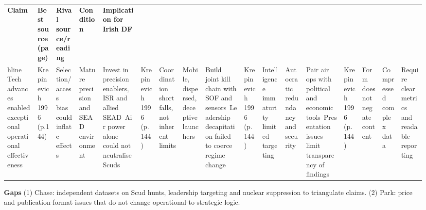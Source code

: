 \usepackage{array}
\begin{tabular}{p{3.2cm}p{4.2cm}p{3.6cm}p{3.2cm}p{4.2cm}}
	\textbf{Claim} & \textbf{Best source (page)} & \textbf{Rival source/reading} & \textbf{Condition} & \textbf{Implication for Irish DF}\\hline
	Tech advances enabled exceptional operational effectiveness & Krepinevich 1996 (p.144) & Selection/access bias could inflate effects & Mature precision and SEAD environment & Invest in precision enablers, ISR and allied SEAD\
	Air power alone could not neutralise Scuds & Krepinevich 1996 (p.144) & Coordination shortfalls, not inherent limits & Mobile, dispersed, deceptive launchers & Build joint kill chain with SOF and sensors\
	Leadership decapitation failed to coerce regime change & Krepinevich 1996 (p.144) & Intelligence immaturity limited targeting & Autocratic redundancy and security & Pair air ops with political and economic tools\
	Presentation issues limit transparency of findings & Krepinevich 1996 (p.144) & Form does not negate content & Compressed complex data & Require clear metrics and readable reporting\
\end{tabular}

\textbf{Gaps}
(1) Chase: independent datasets on Scud hunts, leadership targeting and nuclear suppression to triangulate claims.
(2) Park: price and publication-format issues that do not change operational-to-strategic logic.

\parencite{KREPINEVICH_1992}

